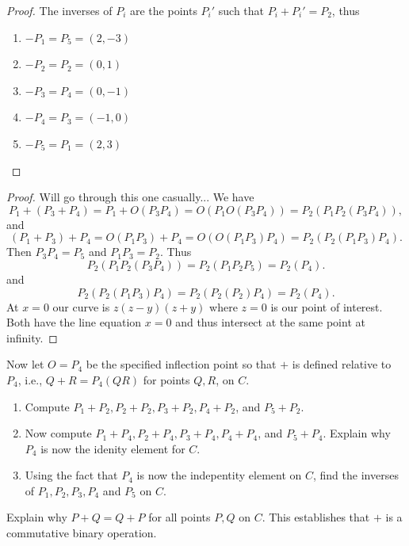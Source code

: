 \begin{proof}
    The inverses of $P_i$ are the points $P_i'$ such that $P_i + P_i' = P_2$, thus
    \begin{enumerate}
        \item $-P_1 = P_5 = (2,-3)$
        \item $-P_2 = P_2 = (0,1)$
        \item $-P_3 = P_4 = (0,-1)$
        \item $-P_4 = P_3 = (-1,0)$
        \item $-P_5 = P_1 = (2,3)$
    \end{enumerate}
\end{proof}

\begin{proof}
    Will go through this one casually... 
    We have 
    \[P_1 + (P_3 + P_4)  = P_1 + O(P_3 P_4) = O(P_1 O(P_3 P_4)) = P_2(P_1 P_2 (P_3 P_4)),\]
    and 
    \[(P_1 + P_3) + P_4 = O(P_1 P_3) + P_4 = O(O(P_1 P_3)P_4) = P_2(P_2(P_1 P_3) P_4).\]
    Then $P_3 P_4 = P_5$ and $P_1 P_3 = P_2$. Thus
    \[
    P_2(P_1 P_2 (P_3 P_4)) = P_2(P_1 P_2 P_5) = P_2(P_4).
    \]
    and 
    \[
    P_2(P_2(P_1 P_3) P_4) = P_2(P_2(P_2) P_4) = P_2(P_4).
    \]
    At $x = 0$ our curve is $z(z - y)(z + y)$ where $z = 0$ is our point of interest.
    Both have the line equation $x = 0$ and thus intersect at the same point at infinity.
\end{proof}

\begin{tcolorbox}[title=Problem 6, breakable]
    Now let $O = P_4$ be the specified inflection point so 
    that $+$ is defined relative to $P_4$, i.e., $Q + R = P_4(QR)$
    for points $Q, R$, on $C$.
    \begin{enumerate}
        \item Compute $P_1 + P_2, P_2 + P_2, P_3 + P_2, P_4 + P_2$, and $P_5 + P_2$.
        \item Now compute $P_1 + P_4, P_2 + P_4, P_3 + P_4, P_4 + P_4$, and $P_5 + P_4$.
        Explain why $P_4$ is now the idenity element for $C$.
        \item Using the fact that $P_4$ is now the indepentity element on $C$, find 
        the inverses of $P_1, P_2, P_3, P_4$ and $P_5$ on $C$.
    \end{enumerate}
\end{tcolorbox}

\begin{tcolorbox}[title=Problem 7, breakable]
    Explain why $P + Q = Q + P$ for all points $P, Q$ on $C$.
    This establishes that $+$ is a commutative binary operation.
\end{tcolorbox}

